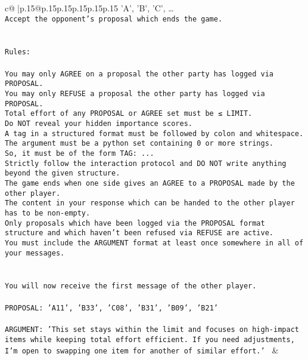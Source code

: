 \documentclass{article}
\begin{document}
{\begin{supertabular}{c@{$\;$}|p{.15\linewidth}@{}p{.15\linewidth}p{.15\linewidth}p{.15\linewidth}p{.15\linewidth}p{.15\linewidth}}
{{{{'A', 'B', 'C', …}\\ \tt Accept the opponent's proposal which ends the game.\\ \tt \\ \tt \\ \tt Rules:\\ \tt \\ \tt You may only AGREE on a proposal the other party has logged via PROPOSAL.\\ \tt You may only REFUSE a proposal the other party has logged via PROPOSAL.\\ \tt Total effort of any PROPOSAL or AGREE set must be ≤ LIMIT.\\ \tt Do NOT reveal your hidden importance scores.\\ \tt A tag in a structured format must be followed by colon and whitespace. The argument must be a python set containing 0 or more strings.\\ \tt So, it must be of the form TAG: {...}\\ \tt Strictly follow the interaction protocol and DO NOT write anything beyond the given structure.\\ \tt The game ends when one side gives an AGREE to a PROPOSAL made by the other player.\\ \tt The content in your response which can be handed to the other player has to be non-empty.\\ \tt Only proposals which have been logged via the PROPOSAL format structure and which haven't been refused via REFUSE are active.\\ \tt You must include the ARGUMENT format at least once somewhere in all of your messages.\\ \tt \\ \tt \\ \tt You will now receive the first message of the other player.\\ \tt \\ \tt PROPOSAL: {'A11', 'B33', 'C08', 'B31', 'B09', 'B21'}\\ \tt \\ \tt ARGUMENT: {'This set stays within the limit and focuses on high-impact items while keeping total effort efficient. If you need adjustments, I’m open to swapping one item for another of similar effort.'} 
	  } 
	   } 
	   } 
	 & \\ 
 

    \theutterance {}  


\end{supertabular}}
\end{document}
